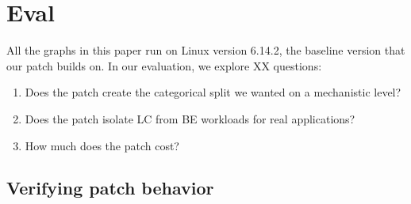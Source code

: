 \section{Eval}
\label{s:eval}

All the graphs in this paper run on Linux version 6.14.2, the baseline version
that our patch builds on. In our evaluation, we explore XX questions:
\begin{enumerate}
    \item Does the patch create the categorical split we wanted on a mechanistic level?
    \item Does the patch isolate LC from BE workloads for real applications?
    \item How much does the patch cost?
\end{enumerate}


\subsection{Verifying patch behavior}

